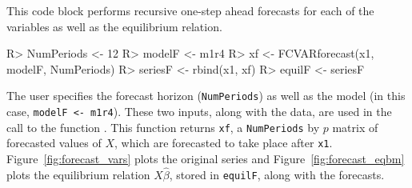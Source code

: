 \documentclass[article]{jss}
\newcommand{\fct}[1]{\code{#1()}}
\begin{document}
This code block 
performs recursive one-step ahead forecasts for each of the variables as well as the equilibrium relation. 
%
%
\begin{Code}
R> NumPeriods <- 12
R> modelF <- m1r4
R> xf <- FCVARforecast(x1, modelF, NumPeriods)
R> seriesF <- rbind(x1, xf) 
R> equilF <- seriesF %
\end{Code}
%
%
%
The user specifies the forecast horizon (\verb|NumPeriods|) as well as the model (in this case, \verb|modelF <- m1r4|). These two inputs, along with the data, are used in the call to the function \fct{FCVARforecast}. This function returns \verb|xf|, a \verb|NumPeriods| by $p$ matrix of forecasted values of $X$, 
which are forecasted to take place after \verb|x1|. 
Figure~\ref{fig:forecast_vars} plots the original series and Figure~\ref{fig:forecast_eqbm} plots the equilibrium relation $X\hat{\beta}$, stored in \verb|equilF|,  along with the forecasts. 

%
\end{document}
